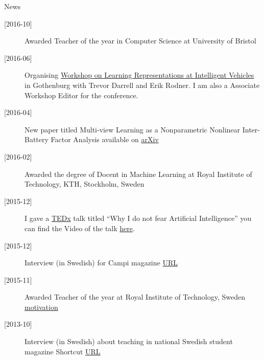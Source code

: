 \documentclass[presentation]{beamer}
\begin{document}
\begin{frame}[label={sec:orgc6083b0}]{News}
\begin{description}
\item[{[2016-10]}] Awarded Teacher of the year in Computer Science at University of Bristol
\item[{[2016-06]}] Organising \href{http://iv2016.berkeleyvision.org/}{Workshop on Learning Representations at Intelligent Vehicles} in Gothenburg with Trevor Darrell and Erik Rodner. I am also a Associate Workshop Editor for the conference.
\item[{[2016-04]}] New paper titled Multi-view Learning as a Nonparametric Nonlinear Inter-Battery Factor Analysis available on \href{http://arxiv.org/abs/1604.04939}{arXiv}
\item[{[2016-02]}] Awarded the degree of Docent in Machine Learning at Royal Institute of Technology, KTH, Stockholm, Sweden
\item[{[2015-12]}] I gave a \href{https://www.ted.com/tedx/events/17751}{TEDx} talk titled “Why I do not fear Artificial Intelligence” you can find the Video of the talk \href{https://www.youtube.com/watch?v=g2FiOz9FlTc&list=PLsRNoUx8w3rNPudaJgiY_3OSFDVy79MU7}{here}.
\item[{[2015-12]}] Interview (in Swedish) for Campi magazine \href{https://campi.kth.se/nyheter/med-bergfast-tilltro-till-studenterna-1.613960}{URL}
\item[{[2015-11]}] Awarded Teacher of the year at Royal Institute of Technology, Sweden \href{file://bin/2015_TeacherOfTheYear.pdf}{motivation}
\item[{[2013-10]}] Interview (in Swedish) about teaching in national Swedish student magazine Shortcut \href{http://shortcut.se/artiklar/man-lar-sig-nar-man-har-roligt/}{URL}
\end{description}
\end{frame}
\end{document}
